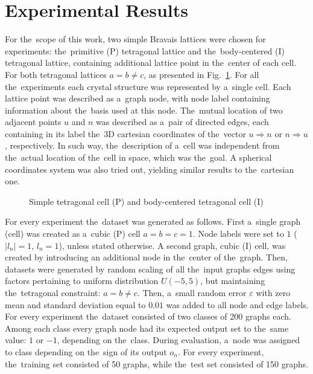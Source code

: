\documentclass{llncs}
\begin{document}
\section{Experimental Results}
For the~scope of this work, two simple Bravais lattices were chosen for experiments: the~primitive (P) tetragonal lattice and the~body-centered (I) tetragonal lattice, containing additional lattice point in the~center of each cell. For both tetragonal lattices $a = b \neq c$, as presented in Fig.~\ref{fig:bravais}. For all the~experiments each crystal structure was represented by a~single cell. Each lattice point was described as a~graph node, with node label containing information about the~basis used at this node. The~mutual location of two adjacent points $u$ and $n$ was described as a~pair of directed edges, each containing in its label the~3D cartesian coordinates of the~vector $u \Rightarrow n$ or $n \Rightarrow u$, respectively. In such way, the~description of a~cell was independent from the~actual location of the~cell in space, which was the~goal. A spherical coordinates system was also tried out, yielding similar results to the~cartesian one.


\begin{figure}[h!]
\begin{center}
	\caption[]{Simple tetragonal cell (P) and body-centered tetragonal cell (I)}
	\label{fig:bravais}
\end{center}
\end{figure}


For every experiment the~dataset was generated as follows. First a~single graph (cell) was created as a~cubic (P) cell $a = b = c = 1$. Node labels were set to $1$ ($|l_n| = 1$, $l_n = 1$), unless stated otherwise. A second graph, cubic (I) cell, was created by introducing an additional node in the~center of the~graph. Then, datasets were generated by random scaling of all the~input graphs edges using factors pertaining to uniform distribution $U(-5, 5)$, but maintaining the~tetragonal constraint: $a = b \neq c$. Then, a~small random error $\varepsilon$ with zero mean and standard deviation equal to $0.01$ was added to all node and edge labels. For every experiment the~dataset consisted of two classes of 200 graphs each. Among each class every graph node had its expected output set to the~same value: $1$ or $-1$, depending on the~class. During evaluation, a~node was assigned to class depending on the~sign of its output $o_n$. For every experiment, the~training set consisted of 50 graphs, while the~test set consisted of 150 graphs.
\end{document}
